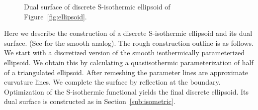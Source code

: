 \documentclass[Thesis.tex]{subfiles}
\begin{document}
\begin{figure}
\centering
{}
\caption{Dual surface of discrete S-isothermic ellipsoid of Figure~\ref{fig:ellipsoid}. }
\label{fig:isometric} 
\end{figure}

Here we describe the construction of a discrete S-isothermic ellipsoid and 
its dual surface. (See \cite[p.~202]{Hertrich2003} for the smooth analog).
The rough construction outline is as follows. We start with a discretized version
of the smooth isothermically parameterized ellipsoid. We obtain this by calculating a 
quasiisothermic parameterization of half of a triangulated ellipsoid. After remeshing 
the parameter lines are approximate curvature lines. We complete the surface by reflection
at the boundary. 
Optimization of the S-isothermic functional yields the final discrete ellipsoid. Its 
dual surface is constructed as in Section~\ref{sub:isometric}.
\end{document}
